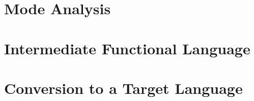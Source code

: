 \documentclass[float=true, crop=false]{standalone}
\begin{document}
\section{Mode Analysis}
\section{Intermediate Functional Language}
\section{Conversion to a Target Language}
\end{document}
